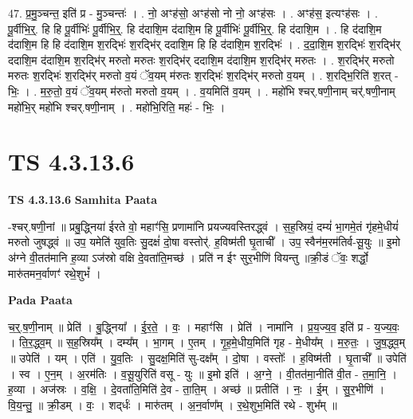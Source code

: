 \documentclass[17pt]{extarticle}
\begin{document}
47. प्र॒मु॒ञ्चन्त॒ इति॑ प्र - मु॒ञ्चन्तः॑ । . नो॒ अꣳह॑सो॒ अꣳह॑सो नो नो॒ अꣳह॑सः । . अꣳह॑स॒ इत्यꣳह॑सः । . पू॒र्वीभि॒र्॒. हि हि पू॒र्वीभिः॑ पू॒र्वीभि॒र्॒. हि द॑दाशि॒म द॑दाशि॒म हि पू॒र्वीभिः॑ पू॒र्वीभि॒र्॒. हि द॑दाशि॒म । . हि द॑दाशि॒म द॑दाशि॒म हि हि द॑दाशि॒म श॒रद्भिः॑ श॒रद्भि॑र् ददाशि॒म हि हि द॑दाशि॒म श॒रद्भिः॑ । . द॒दा॒शि॒म श॒रद्भिः॑ श॒रद्भि॑र् ददाशि॒म द॑दाशि॒म श॒रद्भि॑र् मरुतो मरुतः श॒रद्भि॑र् ददाशि॒म द॑दाशि॒म श॒रद्भि॑र् मरुतः । . श॒रद्भि॑र् मरुतो मरुतः श॒रद्भिः॑ श॒रद्भि॑र् मरुतो व॒यं ॅव॒यम् म॑रुतः श॒रद्भिः॑ श॒रद्भि॑र् मरुतो व॒यम् । . श॒रद्भि॒रिति॑ श॒रत् - भिः॒ । . म॒रु॒तो॒ व॒यं ॅव॒यम् म॑रुतो मरुतो व॒यम् । . व॒यमिति॑ व॒यम् । . महो॑भि श्चर्.षणी॒नाम् चर्॑.षणी॒नाम् महो॑भि॒र् महो॑भि श्चर्.षणी॒नाम् । . महो॑भि॒रिति॒ महः॑ - भिः॒ । \newline
\pagebreak
{}

\section{ TS 4.3.13.6 }

\textbf{TS 4.3.13.6 } \newline
\textbf{Samhita Paata} \newline

-श्चर्.षणी॒नां ॥ प्रबु॒द्ध्निया॑ ईरते वो॒ महाꣳ॑सि॒ प्रणामा॑नि प्रयज्यवस्तिरद्ध्वं । स॒ह॒स्रियं॒ दम्यं॑ भा॒गमे॒तं गृ॑हमे॒धीयं॑ मरुतो जुषद्ध्वं ॥ उप॒ यमेति॑ युव॒तिः सु॒दक्षं॑ दो॒षा वस्तोर्॑. ह॒विष्म॑ती घृ॒ताची᳚ । उप॒ स्वैन॑म॒रम॑तिर्व-सू॒युः ॥ इ॒मो अ॑ग्ने वी॒तत॑मानि ह॒व्या ऽज॑स्रो वक्षि दे॒वता॑ति॒मच्छ॑ । प्रति॑ न ईꣳ सुर॒भीणि॑ वियन्तु ॥क्री॒डं ॅवः॒ शर्द्धो॒ मारु॑तमन॒र्वाणꣳ॑ रथे॒शुभं᳚ । \newline

\textbf{Pada Paata} \newline

च॒र्॒.ष॒णी॒नाम् ॥ प्रेति॑ । बु॒द्ध्निया᳚ । ई॒र॒ते॒ । वः॒ । महाꣳ॑सि । प्रेति॑ । नामा॑नि । प्र॒य॒ज्य॒व॒ इति॑ प्र - य॒ज्य॒वः॒ । ति॒र॒द्ध्व॒म् ॥ स॒ह॒स्रिय᳚म् । दम्य᳚म् । भा॒गम् । ए॒तम् । गृ॒ह॒मे॒धीय॒मिति॑ गृह - मे॒धीय᳚म् । म॒रु॒तः॒ । जु॒ष॒द्ध्व॒म् ॥ उपेति॑ । यम् । एति॑ । यु॒व॒तिः । सु॒दक्ष॒मिति॑ सु-दक्ष᳚म् । दो॒षा । वस्तोः᳚ । ह॒विष्म॑ती । घृ॒ताची᳚ ॥ उपेति॑ । स्व । ए॒न॒म् । अ॒रम॑तिः । व॒सू॒युरिति॑ वसू - युः ॥ इ॒मो इति॑ । अ॒ग्ने॒ । वी॒तत॑मा॒नीति॑ वी॒त - त॒मा॒नि॒ । ह॒व्या । अज॑स्रः । व॒क्षि॒ । दे॒वता॑ति॒मिति॑ दे॒व - ता॒ति॒म् । अच्छ॑ ॥ प्रतीति॑ । नः॒ । ई॒म् । सु॒र॒भीणि॑ । वि॒य॒न्तु॒ ॥ क्री॒डम् । वः॒ । शद्‌र्धः॑ । मारु॑तम् । अ॒न॒र्वाण᳚म् । र॒थे॒शुभ॒मिति॑ रथे - शुभ᳚म् ॥  \newline
\end{document}
